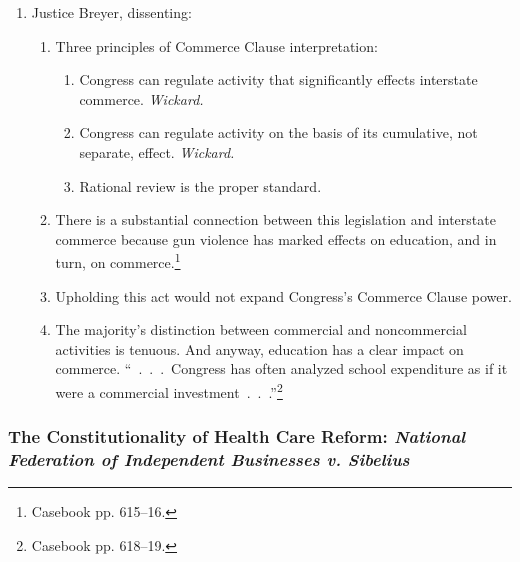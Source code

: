 \begin{enumerate}
\begin{enumerate}
        determinative.\footnote{Casebook pp. 613--14.}
    \end{enumerate}
    \item Justice Breyer, dissenting:
    \begin{enumerate}
        \item Three principles of Commerce Clause interpretation:
        \begin{enumerate}
            \item Congress can regulate activity that significantly effects 
            interstate commerce. \emph{Wickard.}
            \item Congress can regulate activity on the basis of its 
            cumulative, not separate, effect. \emph{Wickard.}
            \item Rational review is the proper standard.
        \end{enumerate}
        \item There is a substantial connection between this legislation and 
        interstate commerce because gun violence has marked effects on 
        education, and in turn, on commerce.\footnote{Casebook pp. 615--16.}
        \item Upholding this act would not expand Congress's Commerce Clause 
        power.
        \item The majority's distinction between commercial and noncommercial 
        activities is tenuous. And anyway, education has a clear impact on 
        commerce. ``~.~.~.~Congress has often analyzed school expenditure as 
        if it were a commercial investment~.~.~.''\footnote{Casebook pp. 
        618--19.}
    \end{enumerate}
\end{enumerate}
 
\subsubsection{The Constitutionality of Health Care Reform: \emph{National 
Federation of Independent Businesses v. Sibelius}}

